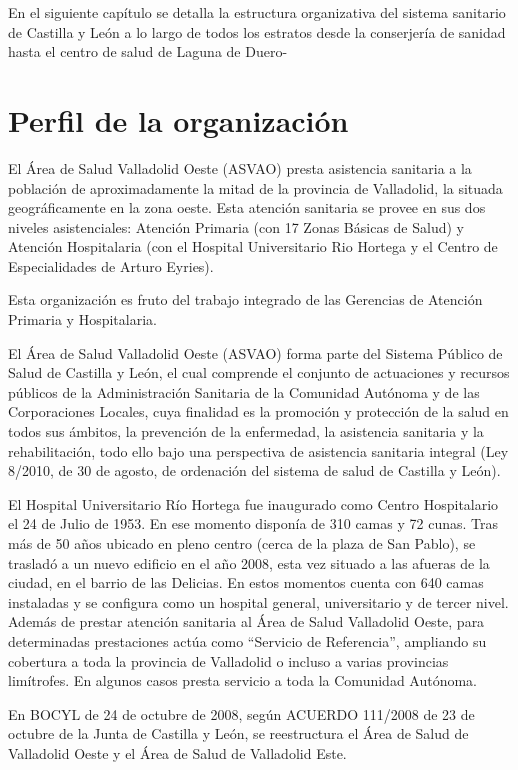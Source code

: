 En el siguiente capítulo se detalla la estructura organizativa del sistema sanitario de Castilla y León a lo largo de todos los estratos desde la conserjería de sanidad hasta el centro de salud de Laguna de Duero-

\section{Perfil de la organización}

El Área de Salud Valladolid Oeste (ASVAO) presta asistencia sanitaria a la población de aproximadamente la mitad de la provincia de Valladolid, la situada geográficamente en la zona oeste. Esta atención sanitaria se provee en sus dos niveles asistenciales: Atención Primaria (con 17 Zonas Básicas de Salud) y Atención Hospitalaria (con el Hospital Universitario Rio Hortega y el Centro de Especialidades de Arturo Eyries).

Esta organización es fruto del trabajo integrado de las Gerencias de Atención Primaria y Hospitalaria.

El Área de Salud Valladolid Oeste (ASVAO) forma parte del Sistema Público de Salud de Castilla y León, el cual comprende el conjunto de actuaciones y recursos públicos de la Administración Sanitaria de la Comunidad Autónoma y de las Corporaciones Locales, cuya finalidad es la promoción y protección de la salud en todos sus ámbitos, la prevención de la enfermedad, la asistencia sanitaria y la rehabilitación, todo ello bajo una perspectiva de asistencia sanitaria integral (Ley 8/2010, de 30 de agosto, de ordenación del sistema de salud de Castilla y León).

El Hospital Universitario Río Hortega fue inaugurado como Centro Hospitalario el 24 de Julio de 1953. En ese momento disponía de 310 camas y 72 cunas. Tras más de 50 años ubicado en pleno centro (cerca de la plaza de San Pablo), se trasladó a un nuevo edificio en el año 2008, esta vez situado a las afueras de la ciudad, en el barrio de las Delicias. En estos momentos cuenta con 640 camas instaladas y se configura como un hospital general, universitario y de tercer nivel. Además de prestar atención sanitaria al Área de Salud Valladolid Oeste, para determinadas prestaciones actúa como “Servicio de Referencia”, ampliando su cobertura a toda la provincia de Valladolid o incluso a varias provincias limítrofes. En algunos casos presta servicio a toda la Comunidad Autónoma.

En BOCYL de 24 de octubre de 2008, según ACUERDO 111/2008 de 23 de octubre de la Junta de Castilla y León, se reestructura el Área de Salud de Valladolid Oeste y el Área de Salud de Valladolid Este.


